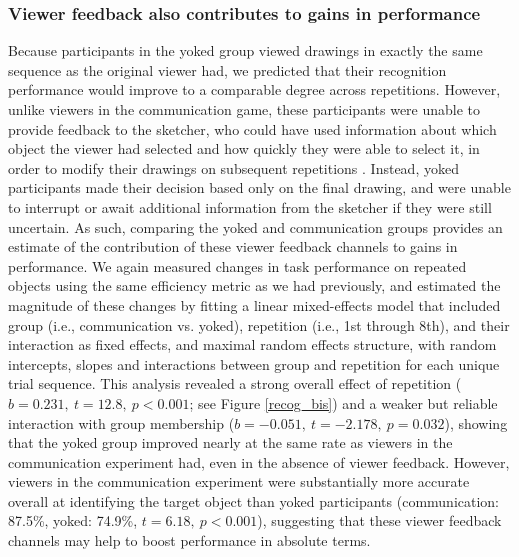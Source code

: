 \documentclass[10pt,letterpaper]{article}
\begin{document}

\subsubsection{Viewer feedback also contributes to gains in performance}

Because participants in the yoked group viewed drawings in exactly the same sequence as the original viewer had, we predicted that their recognition performance would improve to a comparable degree across repetitions.
However, unlike viewers in the communication game, these participants were unable to provide feedback to the sketcher, who could have used information about which object the viewer had selected and how quickly they were able to select it, in order to modify their drawings on subsequent repetitions \cite{schober_understanding_1989}.
Instead, yoked participants made their decision based only on the final drawing, and were unable to interrupt or await additional information from the sketcher if they were still uncertain.
As such, comparing the yoked and communication groups provides an estimate of the contribution of these viewer feedback channels to gains in performance.
We again measured changes in task performance on repeated objects using the same efficiency metric as we had previously, and estimated the magnitude of these changes by fitting a linear mixed-effects model that included group (i.e., communication vs. yoked), repetition (i.e., 1st through 8th), and their interaction as fixed effects, and maximal random effects structure, with random intercepts, slopes and interactions between group and repetition for each unique trial sequence.
This analysis revealed a strong overall effect of repetition ($b = 0.231, ~t = 12.8,~p < 0.001$; see Figure \ref{recog_bis}) and a weaker but reliable interaction with group membership ($b = -0.051, ~t = -2.178, ~p = 0.032$), showing that the yoked group improved nearly at the same rate as viewers in the communication experiment had, even in the absence of viewer feedback. %
However, viewers in the communication experiment were substantially more accurate overall at identifying the target object than yoked participants (communication: 87.5\%, yoked: 74.9\%, $t = 6.18, ~p < 0.001$), suggesting that these viewer feedback channels may help to boost performance in absolute terms. %
\end{document}
